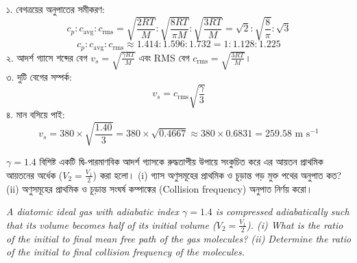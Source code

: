 \documentclass[12pt, a4paper]{article}
\begin{document}
\begin{tcolorbox}[solutionbox={সমাধান (Solution)}]
\noindent
১. বেগত্রয়ের অনুপাতের সমীকরণ:
\[ c_p : c_{\text{avg}} : c_{\text{rms}} = \sqrt{\frac{2RT}{M}} : \sqrt{\frac{8RT}{\pi M}} : \sqrt{\frac{3RT}{M}} = \sqrt{2} : \sqrt{\frac{8}{\pi}} : \sqrt{3} \]
\[ c_p : c_{\text{avg}} : c_{\text{rms}} \approx 1.414 : 1.596 : 1.732 = 1 : 1.128 : 1.225 \]
২. আদর্শ গ্যাসে শব্দের বেগ $v_s = \sqrt{\frac{\gamma R T}{M}}$ এবং RMS বেগ $c_{\text{rms}} = \sqrt{\frac{3 R T}{M}}$। \\
৩. দুটি বেগের সম্পর্ক:
\[ v_s = c_{\text{rms}} \sqrt{\frac{\gamma}{3}} \]
৪. মান বসিয়ে পাই:
\[ v_s = 380 \times \sqrt{\frac{1.40}{3}} = 380 \times \sqrt{0.4667} \approx 380 \times 0.6831 = 259.58\text{ m s}^{-1} \]
\end{tcolorbox}
\begin{tcolorbox}[questionbox={প্রশ্ন (Question) 5}]
\noindent
$\gamma = 1.4$ বিশিষ্ট একটি দ্বি-পারমাণবিক আদর্শ গ্যাসকে রুদ্ধতাপীয় উপায়ে সংকুচিত করে এর আয়তন প্রাথমিক আয়তনের অর্ধেক ($V_2 = \frac{V_1}{2}$) করা হলো। (i) গ্যাস অণুসমূহের প্রাথমিক ও চূড়ান্ত গড় মুক্ত পথের অনুপাত কত? (ii) অণুসমূহের প্রাথমিক ও চূড়ান্ত সংঘর্ষ কম্পাঙ্কের (Collision frequency) অনুপাত নির্ণয় করো।

\vspace{0.8em}
\begin{english}
\noindent\textit{\color{darkgray}
A diatomic ideal gas with adiabatic index $\gamma = 1.4$ is compressed adiabatically such that its volume becomes half of its initial volume ($V_2 = \frac{V_1}{2}$). (i) What is the ratio of the initial to final mean free path of the gas molecules? (ii) Determine the ratio of the initial to final collision frequency of the molecules.
}
\end{english}
\end{tcolorbox}

\vspace{1em}
\end{document}
